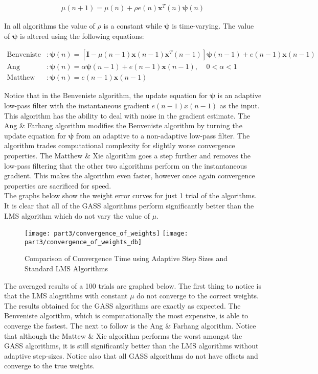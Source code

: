 \begin{align*}
\mu(n+1)=\mu(n) + \rho e(n) \textbf{x}^T(n)\bm{\psi}(n)
\end{align*}

\noindent{}In all algorithms the value of $\rho$ is a constant while $\bm{\psi}$ is time-varying. The value of $\bm{\psi}$ is altered using the following equations:

\begin{align*}
\text{Benveniste}&: \bm{\psi}(n)=[\textbf{I}-\mu(n-1)\textbf{x}(n-1)\textbf{x}^T(n-1)]\bm{\psi}(n-1) + e(n-1)\bm{x}(n-1) \\
\text{Ang \& Farhang}&: \bm{\psi}(n)=\alpha\bm{\psi}(n-1) + e(n-1)\bm{x}(n-1), \ \ \ \ \ 0 < \alpha < 1 \\
\text{Matthew \& Xie}&: \bm{\psi}(n)=e(n-1)\bm{x}(n-1)
\end{align*}

\noindent{}Notice that in the Benveniste algorithm, the update equation for $\bm{\psi}$ is an adaptive low-pass filter with the instantaneous gradient $e(n-1)x(n-1)$ as the input. This algorithm has the ability to deal with noise in the gradient estimate. The Ang \& Farhang algorithm modifies the Benveniste algorithm by turning the update equation for $\bm{\psi}$ from an adaptive to a non-adaptive low-pass filter. The algorithm trades computational complexity for slightly worse convergence properties. The Matthew \& Xie algorithm goes a step further and removes the low-pass filtering that the other two algorithms perform on the instantaneous gradient. This makes the algorithm even faster, however once again convergence properties are sacrificed for speed.\\

\noindent{}The graphs below show the weight error curves for just 1 trial of the algorithms. It is clear that all of the GASS algorithms perform significantly better than the LMS algorithm which do not vary the value of $\mu$.

\begin{figure}[H]
\centering{}
\texttt{[image: part3/convergence\_of\_weights]}
\texttt{[image: part3/convergence\_of\_weights\_db]}
\caption{Comparison of Convergence Time using Adaptive Step Sizes and Standard LMS Algorithms}
\end{figure}

\noindent{}The averaged results of a 100 trials are graphed below. The first thing to notice is that the LMS alogrithms with constant $\mu$ do not converge to the correct weights. The results obtained for the GASS algorithms are exactly as expected. The Benveniste algorithm, which is computationally the most expensive, is able to converge the fastest. The next to follow is the Ang \& Farhang algorithm. Notice that although the Mattew \& Xie algorithm performs the worst amongst the GASS algorithms, it is still significantly better than the LMS algorithms without adaptive step-sizes. Notice also that all GASS algorithms do not have offsets and converge to the true weights.


